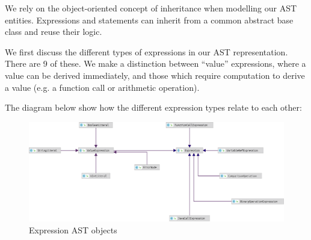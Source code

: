 \documentclass[a4paper,openany,12pt]{book}
\begin{document}
We rely on the object-oriented concept of inheritance when modelling our AST entities.
Expressions and statements can inherit from a common abstract base class and reuse their logic.

We first discuss the different types of expressions in our AST representation.
There are 9 of these.
We make a distinction between ``value'' expressions, where a value can be derived immediately, and those which require
computation to derive a value (e.g. a function call or arithmetic operation).

The diagram below show how the different expression types relate to each other:

\begin{figure}[H]
    \begin{MyMdframed}
        \vspace{0.5em}

        \caption{\label{figure:ast:expressions}Expression AST objects}
        \vspace{0.5em}
        \captionsetup{style=default}

        \centering \includegraphics[width=0.9\linewidth]{expressions.eps}
    \end{MyMdframed}
\end{figure}
\end{document}
